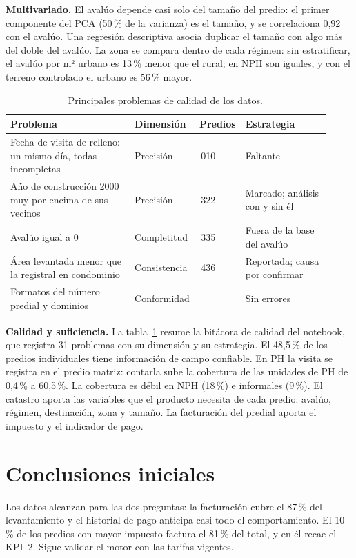 \documentclass[12pt,letterpaper]{article}
\begin{document}
\textbf{Multivariado.} El avalúo depende casi solo del tamaño del predio: el primer componente
del PCA (50\,\% de la varianza) es el tamaño, y se correlaciona 0,92 con el avalúo. Una
regresión descriptiva asocia duplicar el tamaño con algo más del doble del avalúo. La zona se
compara dentro de cada régimen: sin estratificar, el avalúo por m² urbano es 13\,\% menor que el
rural; en NPH son iguales, y con el terreno controlado el urbano es 56\,\% mayor.

\begin{table}[ht]
  \centering
  \caption{Principales problemas de calidad de los datos.}
  \label{tab:calidad}
  \small
  \begin{tabular}{@{}>{\raggedright\arraybackslash}p{0.40\linewidth}
                     >{\raggedright\arraybackslash}p{0.15\linewidth}
                     >{\raggedleft\arraybackslash}p{0.10\linewidth}
                     >{\raggedright\arraybackslash}p{0.27\linewidth}@{}}
    \toprule
    Problema & Dimensión & Predios & Estrategia \\
    \midrule
    Fecha de visita de relleno: un mismo día, todas incompletas & Precisión & 9\,010 & Faltante \\
    Año de construcción 2000 muy por encima de sus vecinos & Precisión & 3\,322 & Marcado; análisis con y sin él \\
    Avalúo igual a 0 & Completitud & 2\,335 & Fuera de la base del avalúo \\
    Área levantada menor que la registral en condominio & Consistencia & 1\,436 & Reportada; causa por confirmar \\
    Formatos del número predial y dominios & Conformidad & 0 & Sin errores \\
    \bottomrule
  \end{tabular}
\end{table}

\textbf{Calidad y suficiencia.} La tabla~\ref{tab:calidad} resume la bitácora de calidad del
notebook, que registra 31 problemas con su dimensión y su estrategia. El 48,5\,\% de los predios
individuales tiene información de campo confiable. En PH la visita se registra en el predio
matriz: contarla sube la cobertura de las unidades de PH de 0,4\,\% a 60,5\,\%. La cobertura es
débil en NPH (18\,\%) e informales (9\,\%). El catastro aporta las variables que el producto
necesita de cada predio: avalúo, régimen, destinación, zona y tamaño. La facturación del predial
aporta el impuesto y el indicador de pago.

\section{Conclusiones iniciales} %
Los datos alcanzan para las dos preguntas: la facturación cubre el 87\,\% del levantamiento y el
historial de pago anticipa casi todo el comportamiento. El 10\,\% de los predios con mayor
impuesto factura el 81\,\% del total, y en él recae el KPI~2. Sigue validar el motor con las
tarifas vigentes.

\printbibliography
\end{document}
